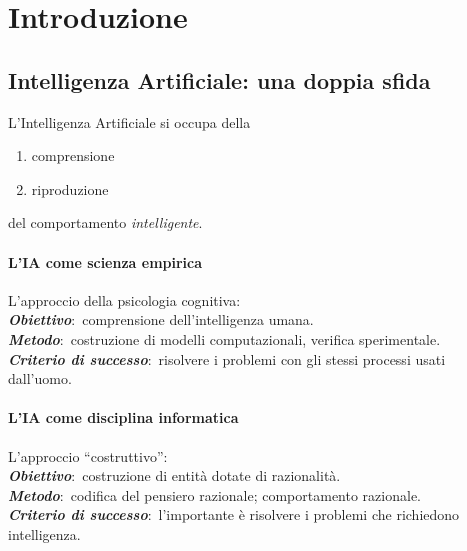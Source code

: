 \chapter{Introduzione}

\section{Intelligenza Artificiale: una doppia sfida}

L'Intelligenza Artificiale si occupa della
\begin{enumerate}
	\item comprensione
	\item riproduzione
\end{enumerate}
del comportamento \textit{intelligente}.
\subsubsection{L'IA come scienza empirica}

L'approccio della psicologia cognitiva:\\
\textbf{\textit{Obiettivo}}:\ comprensione dell'intelligenza umana.\\
\textbf{\textit{Metodo}}:\ costruzione di modelli computazionali, verifica sperimentale.\\
\textbf{\textit{Criterio di successo}}:\ risolvere i problemi con gli stessi processi usati dall'uomo.

\subsubsection{L'IA come disciplina informatica}
L'approccio ``costruttivo'':\\
\textbf{\textit{Obiettivo}}:\ costruzione di entità dotate di razionalità.\\
\textbf{\textit{Metodo}}:\ codifica del pensiero razionale; comportamento razionale.\\
\textbf{\textit{Criterio di successo}}:\ l'importante è risolvere i problemi che richiedono intelligenza.

